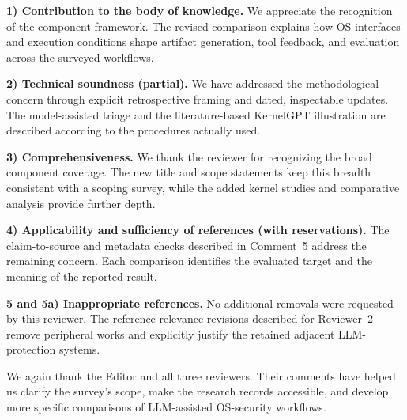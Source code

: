 \documentclass[11pt,a4paper]{article}
\begin{document}
\textbf{1) Contribution to the body of knowledge.} We appreciate the recognition of the component framework. The revised comparison explains how OS interfaces and execution conditions shape artifact generation, tool feedback, and evaluation across the surveyed workflows.

\textbf{2) Technical soundness (partial).} We have addressed the methodological concern through explicit retrospective framing and dated, inspectable updates. The model-assisted triage and the literature-based KernelGPT illustration are described according to the procedures actually used.

\textbf{3) Comprehensiveness.} We thank the reviewer for recognizing the broad component coverage. The new title and scope statements keep this breadth consistent with a scoping survey, while the added kernel studies and comparative analysis provide further depth.

\textbf{4) Applicability and sufficiency of references (with reservations).} The claim-to-source and metadata checks described in Comment~5 address the remaining concern. Each comparison identifies the evaluated target and the meaning of the reported result.

\textbf{5 and 5a) Inappropriate references.} No additional removals were requested by this reviewer. The reference-relevance revisions described for Reviewer~2 remove peripheral works and explicitly justify the retained adjacent LLM-protection systems.

\medskip
We again thank the Editor and all three reviewers. Their comments have helped us clarify the survey's scope, make the research records accessible, and develop more specific comparisons of LLM-assisted OS-security workflows.
\end{document}
